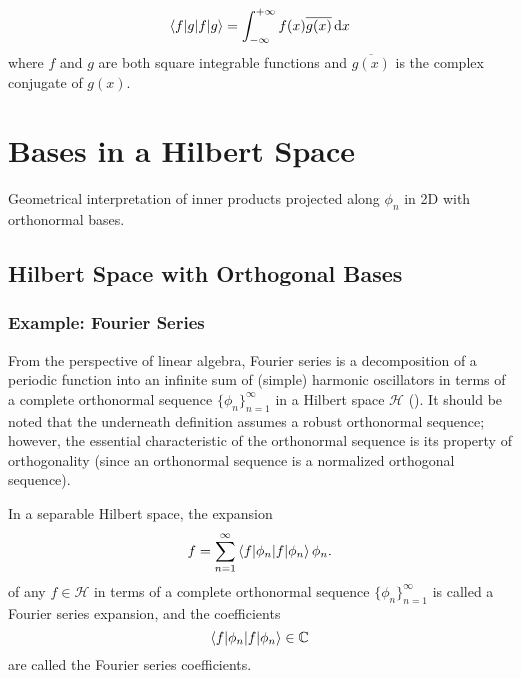 \begin{equation}
\braket{f|g} =\int _{- \infty}^{+ \infty}{f(x)} \overline {g(x)}\,\mathrm {d} x
\end{equation}
where $f$ and $g$ are both square integrable functions and
$\overline {g(x)}$ is the complex conjugate of $g(x)$.



\section{Bases in a Hilbert Space}

\begin{marginfigure}
\centering
\vspace{2cm}

\vspace{0.1cm}
\caption{Geometrical interpretation of inner products projected along $\phi_n$ in 2D with orthonormal bases.}
\label{geomF} 
\end{marginfigure}

\subsection{Hilbert Space with Orthogonal Bases}
\subsubsection{Example: Fourier Series}
From the perspective of linear algebra, Fourier series is a decomposition of a periodic function into an infinite sum of (simple) harmonic oscillators in terms of a complete orthonormal sequence $\{\phi_n \}^\infty_{n=1}$ in a Hilbert space $\mathcal{H}$ (\cite{russel_92_2021, kennedy_hilbert_2013}). It should be noted that the underneath definition assumes a robust orthonormal sequence; however, the essential characteristic of the orthonormal sequence is its property of orthogonality (since an orthonormal sequence is a normalized orthogonal sequence).



\begin{theorem}
\label{fourierSeriesHilbert}
    In a separable Hilbert space, the expansion
    \begin{equation}
    f = \sum_{n=1}^{\infty} \braket{f | \phi_n} \phi_n.
\end{equation}
of any $f \in \mathcal{H}$ in terms of a complete orthonormal sequence $\{\phi_n\}_{n=1}^\infty$ is called a Fourier series expansion, and the coefficients 
\begin{equation}
    \braket{f | \phi_n} \in \mathbb{C} 
\end{equation}
are called the Fourier series coefficients.
\end{theorem}


